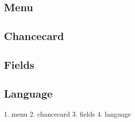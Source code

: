 \subsection{Menu}
\subsection{Chancecard}
\subsection{Fields}
\subsection{Language}
1. menu %
2. chancecard %
3. fields %
4. language %